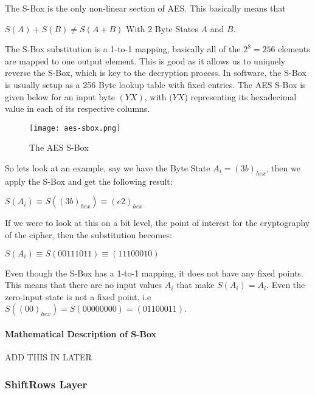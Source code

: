 The S-Box is the only non-linear section of AES. This basically means that

\begin{center}
$S(A) + S(B) \neq S(A + B)$
With 2 Byte States $A$ and $B$.
\end{center}

The S-Box substitution is a 1-to-1 mapping, basically all of the $2^8 = 256$ elements are mapped to one output element. This is good as it allows us to uniquely reverse the S-Box, which is key to the decryption process. In software, the S-Box is usually setup as a 256 Byte lookup table with fixed entries. The AES S-Box is given below for an input byte $(YX)$, with $(YX$) representing its hexadecimal value in each of its respective columns.

\begin{figure}[h!]
\begin{center}
\texttt{[image: aes-sbox.png]}
\end{center}
\caption{The AES S-Box}
\label{AES-S-BOX}
\end{figure}

So lets look at an example, say we have the Byte State $A_i = (3b)_{hex}$, then we apply the S-Box and get the following result:

\begin{center}
$S(A_i) \equiv S((3b)_{hex}) \equiv (e2)_{hex}$
\end{center}

If we were to look at this on a bit level, the point of interest for the cryptography of the cipher, then the substitution becomes:

\begin{center}
$S(A_i) \equiv S(00111011) \equiv (11100010)$
\end{center}

Even though the S-Box has a 1-to-1 mapping, it does not have any fixed points. This means that there are no input values $A_i$ that make $S(A_i) = A_i$. Even the zero-input state is not a fixed point, i.e $S((00)_{hex}) = S(00000000) = (01100011)$.

\paragraph{Mathematical Description of S-Box}

\begin{center}
ADD THIS IN LATER
\end{center}

\subsubsection{ShiftRows Layer}

